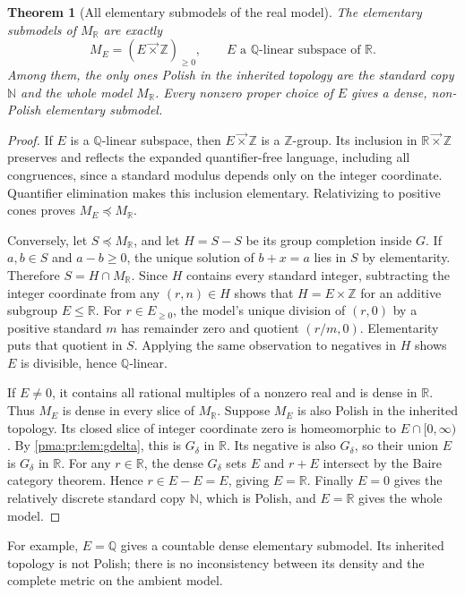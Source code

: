 \documentclass[11pt]{article}
\numberwithin{equation}{section}
\newtheorem{theorem}{Theorem}[section]
\theoremstyle{definition}
\theoremstyle{remark}
\newcommand{\N}{\mathbb N}
\newcommand{\Z}{\mathbb Z}
\newcommand{\Q}{\mathbb Q}
\newcommand{\R}{\mathbb R}
\newcommand{\lex}{\mathbin{\overrightarrow\times}}
\newcommand{\MR}{M_{\R}}
\begin{document}
\begin{theorem}[All elementary submodels of the real model]
\label{pma:pr:thm:submodels}
The elementary submodels of $\MR$ are exactly
\begin{equation}
 M_E=(E\lex\Z)_{\geq0},
 \qquad E\text{ a }\Q\text{-linear subspace of }\R.
 \label{pma:pr:eq:submodels}
\end{equation}
Among them, the only ones Polish in the inherited topology are the
standard copy $\N$ and the whole model $\MR$. Every nonzero proper
choice of $E$ gives a dense, non-Polish elementary submodel.
\end{theorem}
\begin{proof}
If $E$ is a $\Q$-linear subspace, then $E\lex\Z$ is a $\Z$-group.
Its inclusion in $\R\lex\Z$ preserves and reflects the expanded
quantifier-free language, including all congruences, since a standard
modulus depends only on the integer coordinate. Quantifier elimination
makes this inclusion elementary. Relativizing to positive cones proves
$M_E\preccurlyeq\MR$.

Conversely, let $S\preccurlyeq\MR$, and let $H=S-S$ be its group
completion inside $G$. If $a,b\in S$ and $a-b\geq0$, the unique solution
of $b+x=a$ lies in $S$ by elementarity. Therefore
$S=H\cap\MR$. Since $H$ contains every standard integer, subtracting
the integer coordinate from any $(r,n)\in H$ shows that
$H=E\times\Z$ for an additive subgroup $E\leq\R$.
For $r\in E_{\geq0}$, the model's unique division of $(r,0)$ by a
positive standard $m$ has remainder zero and quotient $(r/m,0)$.
Elementarity puts that quotient in $S$. Applying the same observation
to negatives in $H$ shows $E$ is divisible, hence $\Q$-linear.

If $E\neq0$, it contains all rational multiples of a nonzero real and
is dense in $\R$. Thus $M_E$ is dense in every slice of $\MR$.
Suppose $M_E$ is also Polish in the inherited topology. Its closed slice
of integer coordinate zero is homeomorphic to $E\cap[0,\infty)$.
By \cref{pma:pr:lem:gdelta}, this is $G_\delta$ in $\R$. Its negative is also
$G_\delta$, so their union $E$ is $G_\delta$ in $\R$.
For any $r\in\R$, the dense $G_\delta$ sets $E$ and $r+E$ intersect
by the Baire category theorem. Hence $r\in E-E=E$, giving $E=\R$.
Finally $E=0$ gives the relatively discrete standard copy $\N$, which
is Polish, and $E=\R$ gives the whole model.
\end{proof}

For example, $E=\Q$ gives a countable dense elementary submodel. Its
inherited topology is not Polish; there is no inconsistency between its
density and the complete metric on the ambient model.
\end{document}
